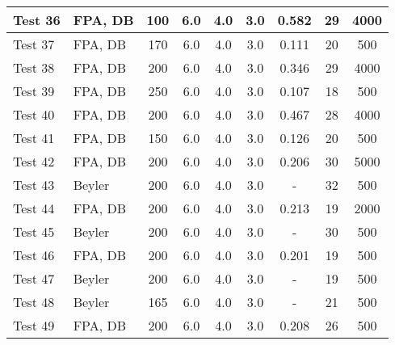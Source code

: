 \begin{table}[!ht]
\begin{center}
\begin{tabular}{|l|l|c|c|c|c|c|c|c|}
Test 36    &  FPA, DB           &  100            &  6.0       &  4.0       &  3.0       &  0.582          &  29                &  4000              \\ \hline
Test 37    &  FPA, DB           &  170            &  6.0       &  4.0       &  3.0       &  0.111          &  20                &  500               \\ \hline
Test 38    &  FPA, DB           &  200            &  6.0       &  4.0       &  3.0       &  0.346          &  29                &  4000              \\ \hline
Test 39    &  FPA, DB           &  250            &  6.0       &  4.0       &  3.0       &  0.107          &  18                &  500               \\ \hline
Test 40    &  FPA, DB           &  200            &  6.0       &  4.0       &  3.0       &  0.467          &  28                &  4000              \\ \hline
Test 41    &  FPA, DB           &  150            &  6.0       &  4.0       &  3.0       &  0.126          &  20                &  500               \\ \hline
Test 42    &  FPA, DB           &  200            &  6.0       &  4.0       &  3.0       &  0.206          &  30                &  5000              \\ \hline
Test 43    &  Beyler            &  200            &  6.0       &  4.0       &  3.0       &  -              &  32                &  500               \\ \hline
Test 44    &  FPA, DB           &  200            &  6.0       &  4.0       &  3.0       &  0.213          &  19                &  2000              \\ \hline
Test 45    &  Beyler            &  200            &  6.0       &  4.0       &  3.0       &  -              &  30                &  500               \\ \hline
Test 46    &  FPA, DB           &  200            &  6.0       &  4.0       &  3.0       &  0.201          &  19                &  500               \\ \hline
Test 47    &  Beyler            &  200            &  6.0       &  4.0       &  3.0       &  -              &  19                &  500               \\ \hline
Test 48    &  Beyler            &  165            &  6.0       &  4.0       &  3.0       &  -              &  21                &  500               \\ \hline
Test 49    &  FPA, DB           &  200            &  6.0       &  4.0       &  3.0       &  0.208          &  26                &  500               \\ \hline

\end{tabular}
\end{center}
\end{table}

